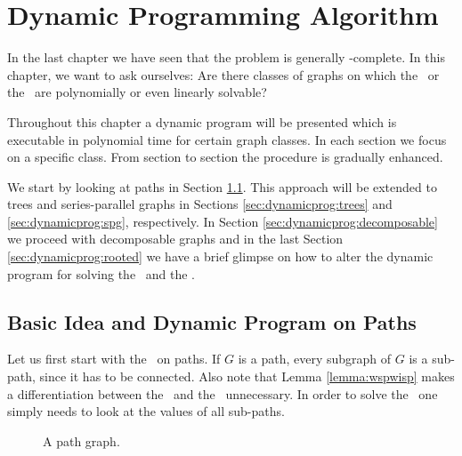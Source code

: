 \section{Dynamic Programming Algorithm}
\label{sec:dynamicprog}

In the last chapter we have seen that the problem is generally \NP-complete. In this chapter, we want to ask ourselves: Are there classes of graphs on which the \WSP\ or the \WISP\ are polynomially or even linearly solvable?\medskip

Throughout this chapter a dynamic program will be presented which is executable in polynomial time for certain graph classes. In each section we focus on a specific class. From section to section the procedure is gradually enhanced.\medskip

We start by looking at paths in Section \ref{sec:dynamicprog:paths}. This approach will be extended to trees and series-parallel graphs in Sections \ref{sec:dynamicprog:trees} and \ref{sec:dynamicprog:spg}, respectively. In Section \ref{sec:dynamicprog:decomposable} we proceed with decomposable graphs and in the last Section \ref{sec:dynamicprog:rooted} we have a brief glimpse on how to alter the dynamic program for solving the \RWSP\ and the \RWISP.

\subsection{Basic Idea and Dynamic Program on Paths}
\label{sec:dynamicprog:paths}

Let us first start with the \WSP\ on paths. If $G$ is a path, every subgraph of $G$ is a sub-path, since it has to be connected. Also note that Lemma \ref{lemma:wspwisp} makes a differentiation between the \WSP\ and the \WISP\ unnecessary. In order to solve the \WSP\ one simply needs to look at the values of all sub-paths.\medskip

\begin{figure}[h]
	\centering
	\caption{A path graph.}
	\label{fig:pathgraph}
\end{figure}

